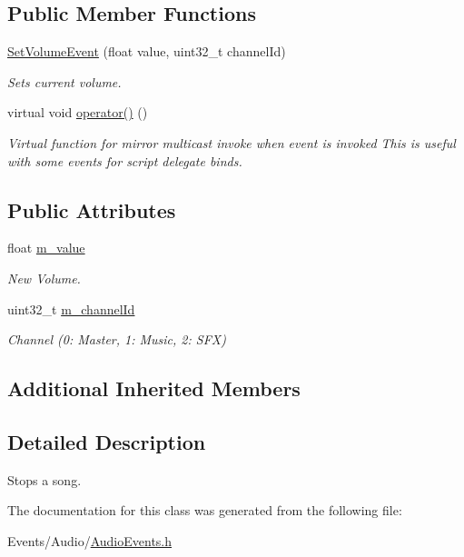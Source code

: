 \subsection*{Public Member Functions}
\begin{DoxyCompactItemize}
\item 
\mbox{\label{classSetVolumeEvent_aa4ca42f5b647c89758af59328c6627be}} 
\hyperlink{classSetVolumeEvent_aa4ca42f5b647c89758af59328c6627be}{Set\+Volume\+Event} (float value, uint32\+\_\+t channel\+Id)
\begin{DoxyCompactList}\small\item\em Sets current volume. \end{DoxyCompactList}\item 
\mbox{\label{classSetVolumeEvent_a3c82bec324ff0cbb251966a0a6c56cba}} 
virtual void \hyperlink{classSetVolumeEvent_a3c82bec324ff0cbb251966a0a6c56cba}{operator()} ()
\begin{DoxyCompactList}\small\item\em Virtual function for mirror multicast invoke when event is invoked This is useful with some events for script delegate binds. \end{DoxyCompactList}\end{DoxyCompactItemize}
\subsection*{Public Attributes}
\begin{DoxyCompactItemize}
\item 
\mbox{\label{classSetVolumeEvent_ae5e80eaf2061a97336e67e80083a83fc}} 
float \hyperlink{classSetVolumeEvent_ae5e80eaf2061a97336e67e80083a83fc}{m\+\_\+value}
\begin{DoxyCompactList}\small\item\em New Volume. \end{DoxyCompactList}\item 
\mbox{\label{classSetVolumeEvent_ae9adcf71bf7bab179dccad1212a0529c}} 
uint32\+\_\+t \hyperlink{classSetVolumeEvent_ae9adcf71bf7bab179dccad1212a0529c}{m\+\_\+channel\+Id}
\begin{DoxyCompactList}\small\item\em Channel (0\+: Master, 1\+: Music, 2\+: S\+FX) \end{DoxyCompactList}\end{DoxyCompactItemize}
\subsection*{Additional Inherited Members}


\subsection{Detailed Description}
Stops a song. 

The documentation for this class was generated from the following file\+:\begin{DoxyCompactItemize}
\item 
Events/\+Audio/\hyperlink{AudioEvents_8h}{Audio\+Events.\+h}\end{DoxyCompactItemize}

